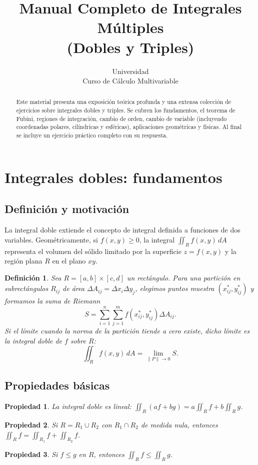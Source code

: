 \documentclass[12pt,spanish]{article}
\title{Manual Completo de Integrales Múltiples\\ (Dobles y Triples)}
\author{Universidad\\ Curso de Cálculo Multivariable}
\date{}
\newtheorem{definicion}{Definición}[section]
\newtheorem{propiedad}{Propiedad}[section]
\begin{document}
\maketitle

\begin{abstract}
Este material presenta una exposición teórica profunda y una extensa colección de ejercicios sobre integrales dobles y triples. Se cubren los fundamentos, el teorema de Fubini, regiones de integración, cambio de orden, cambio de variable (incluyendo coordenadas polares, cilíndricas y esféricas), aplicaciones geométricas y físicas. Al final se incluye un ejercicio práctico completo con su respuesta.
\end{abstract}

\tableofcontents

\section{Integrales dobles: fundamentos}

\subsection{Definición y motivación}

La integral doble extiende el concepto de integral definida a funciones de dos variables. Geométricamente, si $f(x,y)\ge 0$, la integral $\iint_R f(x,y)\,dA$ representa el volumen del sólido limitado por la superficie $z=f(x,y)$ y la región plana $R$ en el plano $xy$.

\begin{definicion}
Sea $R=[a,b]\times[c,d]$ un rectángulo. Para una partición en subrectángulos $R_{ij}$ de área $\Delta A_{ij}=\Delta x_i\Delta y_j$, elegimos puntos muestra $(x_{ij}^*,y_{ij}^*)$ y formamos la suma de Riemann
\[
S=\sum_{i=1}^n\sum_{j=1}^m f(x_{ij}^*,y_{ij}^*)\Delta A_{ij}.
\]
Si el límite cuando la norma de la partición tiende a cero existe, dicho límite es la integral doble de $f$ sobre $R$:
\[
\iint_R f(x,y)\,dA = \lim_{\|P\|\to0} S.
\]
\end{definicion}

\subsection{Propiedades básicas}
\begin{propiedad}
La integral doble es lineal: $\iint_R (af+bg)=a\iint_R f+b\iint_R g$.
\end{propiedad}
\begin{propiedad}
Si $R=R_1\cup R_2$ con $R_1\cap R_2$ de medida nula, entonces $\iint_R f = \iint_{R_1}f+\iint_{R_2}f$.
\end{propiedad}
\begin{propiedad}
Si $f\le g$ en $R$, entonces $\iint_R f \le \iint_R g$.
\end{propiedad}
\end{document}
